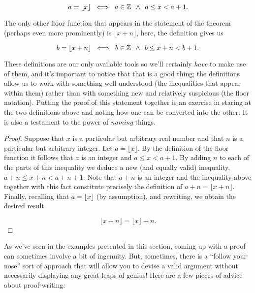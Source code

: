 \[ a = \lfloor x  \rfloor \; \iff \; a \in {\mathbb Z} \; \, 
\land \; \, a \leq x < a+1. \]

The only other floor function that appears in the statement of the theorem
(perhaps even more prominently) 
is $\lfloor x + n\rfloor$, here, the definition gives us
 
\[ b = \lfloor x + n \rfloor \; \iff \; 
b \in {\mathbb Z} \; \, \land \; \, b \leq x + n < b+1. \]

These definitions are our only available tools so we'll certainly \emph{have}
to make use of them, and it's important to notice that that is a good thing;
the definitions allow us to work with something well-understood 
(the inequalities that appear within them) rather than with something 
new and relatively suspicious (the floor notation).  Putting the proof 
of this statement together is an exercise in staring at the two definitions 
above and noting how one can be converted into the other.  It is also a 
testament to the power of \emph{naming} things.

\begin{proof}
Suppose that $x$ is a particular but arbitrary real number 
and that $n$ is a particular but arbitrary integer.  Let 
$a = \lfloor x \rfloor$.  By the definition of the floor function 
it follows that $a$ is an integer and $a \leq x < a+1$.  By adding 
$n$ to each of the parts of this inequality
we deduce a new (and equally valid) inequality, $a+n \leq x+n < a+n+1$.
Note that $a+n$ is an integer and the inequality above together with
this fact constitute precisely the definition of 
$a + n = \lfloor x + n \rfloor$.  Finally, recalling that 
$a = \lfloor x \rfloor$ (by assumption), and rewriting, we obtain the
desired result

\[ \lfloor x + n \rfloor = \lfloor x \rfloor + n. \]

\end{proof} 

As we've seen in the examples presented in this section, coming up
with a proof can sometimes involve a bit of ingenuity. But, sometimes, 
there is a ``follow your nose'' sort of approach that will
allow you to devise a valid argument without necessarily displaying
any great leaps of genius!  Here are a few pieces
of advice about proof-writing:

